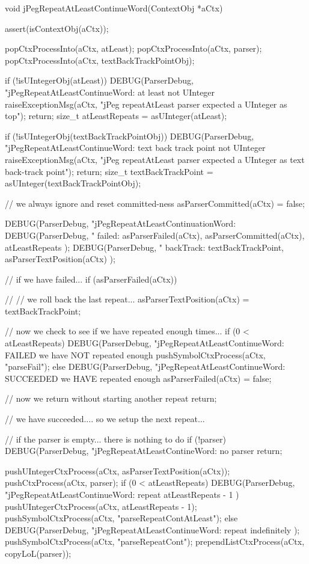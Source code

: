 \startCCode
void jPegRepeatAtLeastContinueWord(ContextObj *aCtx) {
  assert(isContextObj(aCtx));
  
  popCtxProcessInto(aCtx, atLeast);
  popCtxProcessInto(aCtx, parser);
  popCtxProcessInto(aCtx, textBackTrackPointObj);

  if (!isUIntegerObj(atLeast)) {
    DEBUG(ParserDebug,
      "jPegRepeatAtLeastContinueWord: at least not UInteger%
    raiseExceptionMsg(aCtx,
      "jPeg repeatAtLeast parser expected a UInteger as top");
    return;
  }
  size_t atLeastRepeats = asUInteger(atLeast);

  if (!isUIntegerObj(textBackTrackPointObj)) {
    DEBUG(ParserDebug,
      "jPegRepeatAtLeastContinueWord: text back track point not UInteger%
    raiseExceptionMsg(aCtx,
      "jPeg repeatAtLeast parser expected a UInteger as text back-track point");
    return;
  }
  size_t textBackTrackPoint = asUInteger(textBackTrackPointObj);

  // we always ignore and reset committed-ness
  asParserCommitted(aCtx) = false;

  DEBUG(ParserDebug,
    "jPegRepeatAtLeastContinuationWord:%
  DEBUG(ParserDebug,
    "  failed: %
    asParserFailed(aCtx), asParserCommitted(aCtx),
    atLeastRepeats
  );
  DEBUG(ParserDebug,
    "  backTrack: %
    textBackTrackPoint, asParserTextPosition(aCtx)
  );
    
  // if we have failed...
  if (asParserFailed(aCtx)) {
    //
    // we roll back the last repeat...
    asParserTextPosition(aCtx) = textBackTrackPoint;
    
    // now we check to see if we have repeated enough times...
    if (0 < atLeastRepeats) {
      DEBUG(ParserDebug,
        "jPegRepeatAtLeastContinueWord: FAILED we have NOT repeated enough%
      pushSymbolCtxProcess(aCtx, "parseFail");
    } else {
      DEBUG(ParserDebug,
        "jPegRepeatAtLeastContinueWord: SUCCEEDED we HAVE repeated enough%
      asParserFailed(aCtx) = false;
    }
    
    // now we return without starting another repeat
    return;
  }
  
  // we have succeeded.... so we setup the next repeat...
  
  // if the parser is empty... there is nothing to do
  if (!parser) {
    DEBUG(ParserDebug, "jPegRepeatAtLeastContineWord: no parser%
    return;
  }

  pushUIntegerCtxProcess(aCtx, asParserTextPosition(aCtx));
  pushCtxProcess(aCtx, parser);
  if (0 < atLeastRepeats) {
    DEBUG(ParserDebug,
      "jPegRepeatAtLeastContinueWord: repeat %
      atLeastRepeats - 1
    )
    pushUIntegerCtxProcess(aCtx, atLeastRepeats - 1);
    pushSymbolCtxProcess(aCtx, "parseRepeatContAtLeast");
  } else {
    DEBUG(ParserDebug,
      "jPegRepeatAtLeastContinueWord: repeat indefinitely%
    );
    pushSymbolCtxProcess(aCtx, "parseRepeatCont");
  }
  prependListCtxProcess(aCtx, copyLoL(parser));
}
\stopCCode

